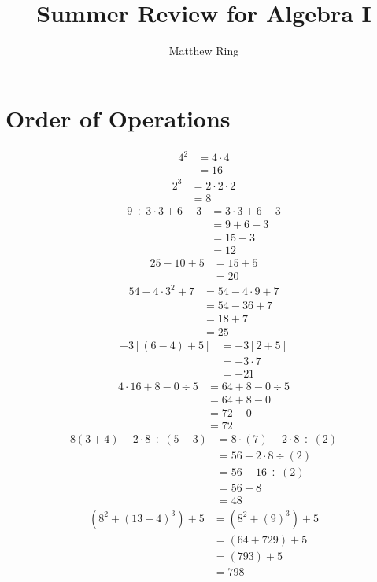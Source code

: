 \documentclass[11pt]{article} %
\title{Summer Review for Algebra I}
\author{Matthew Ring}
\begin{document}
\maketitle

\section{Order of Operations}
\begin{align*}
4^2 &= 4 \cdot 4\\
&= 16
\end{align*}
\begin{align*}
2^3 &= 2 \cdot 2 \cdot 2 \\
&= 8
\end{align*}
\begin{align*}
9 \div 3 \cdot 3 + 6 - 3 &= 3 \cdot 3 + 6 - 3\\
&= 9 + 6 - 3 \\
&= 15 - 3 \\
&= 12
\end{align*}
\begin{align*}
25 - 10 + 5 &= 15 + 5\\
&= 20
\end{align*}
\begin{align*}
54 - 4 \cdot 3^2 + 7 &= 54 - 4 \cdot 9 + 7\\
&= 54 - 36 + 7 \\
&= 18 + 7 \\
&= 25
\end{align*}
\begin{align*}
-3[(6-4) + 5] &= -3 [2 + 5]\\
&= -3 \cdot 7 \\
&= -21
\end{align*}
\begin{align*}
4 \cdot 16 + 8 - 0 \div 5 &= 64 + 8 - 0 \div 5 \\
&= 64 + 8 - 0 \\
&= 72 - 0 \\
&= 72 
\end{align*}
\begin{align*}
8(3 + 4) - 2 \cdot 8 \div (5-3) &= 8 \cdot (7) - 2 \cdot 8 \div (2) \\
&= 56 - 2 \cdot 8 \div (2) \\
&= 56 - 16 \div (2) \\
&= 56 - 8 \\
&= 48
\end{align*}
\begin{align*}
(8^2 + (13 - 4)^3 ) + 5 &= (8^2 + (9)^3) + 5 \\
&= (64 + 729) + 5 \\
&= (793) + 5 \\
&= 798
\end{align*}
\end{document}
